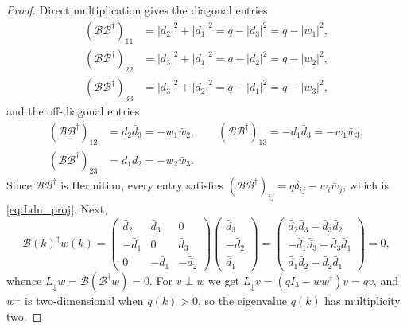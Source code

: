 \documentclass[11pt,a4paper]{article}
\theoremstyle{definition}
\newcommand{\Ldn}{L_{\downarrow}}
\newcommand{\dg}{^{\dagger}}
\newcommand{\Bc}{\mathcal{B}}          %
\begin{document}
\begin{proof}
Direct multiplication gives the diagonal entries
\begin{align*}
  (\Bc\Bc\dg)_{11} &= |d_2|^2 + |d_1|^2 = q - |d_3|^2 = q - |w_1|^2, \\
  (\Bc\Bc\dg)_{22} &= |d_3|^2 + |d_1|^2 = q - |d_2|^2 = q - |w_2|^2, \\
  (\Bc\Bc\dg)_{33} &= |d_3|^2 + |d_2|^2 = q - |d_1|^2 = q - |w_3|^2,
\end{align*}
and the off-diagonal entries
\begin{align*}
  (\Bc\Bc\dg)_{12} &= d_2\bar d_3 = -w_1\bar w_2, \qquad
  (\Bc\Bc\dg)_{13}  = -d_1\bar d_3 = -w_1\bar w_3, \\
  (\Bc\Bc\dg)_{23} &= d_1\bar d_2 = -w_2\bar w_3 .
\end{align*}
Since $\Bc\Bc\dg$ is Hermitian, every entry satisfies $(\Bc\Bc\dg)_{ij} = q\delta_{ij} - w_i\bar w_j$, which is \eqref{eq:Ldn_proj}. Next,
\begin{equation*}
  \Bc(k)\dg w(k) =
  \begin{pmatrix} \bar d_2 & \bar d_3 & 0 \\ -\bar d_1 & 0 & \bar d_3 \\ 0 & -\bar d_1 & -\bar d_2 \end{pmatrix}
  \begin{pmatrix} \bar d_3 \\ -\bar d_2 \\ \bar d_1 \end{pmatrix}
  = \begin{pmatrix} \bar d_2\bar d_3 - \bar d_3\bar d_2 \\ -\bar d_1\bar d_3 + \bar d_3\bar d_1 \\ \bar d_1\bar d_2 - \bar d_2\bar d_1\end{pmatrix} = 0,
\end{equation*}
whence $\Ldn w = \Bc(\Bc\dg w) = 0$. For $v \perp w$ we get $\Ldn v = (qI_3 - ww\dg)v = qv$, and $w^\perp$ is two-dimensional when $q(k)>0$, so the eigenvalue $q(k)$ has multiplicity two.
\end{proof}
\end{document}
